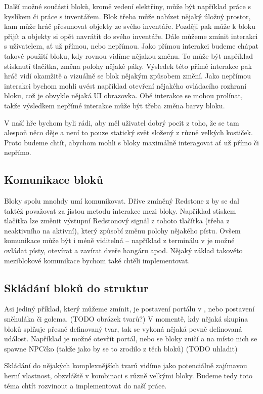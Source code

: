 Další možné součásti bloků, kromě vedení elektřiny, může být například práce s kyslíkem či práce s inventářem. Blok třeba může nabízet nějaký úložný prostor, kam může hráč přesunovat objekty ze svého inventáře. Později pak může k bloku přijít a objekty si opět navrátit do svého inventáře. 
Dále můžeme zmínit interakci s uživatelem, ať už přímou, nebo nepřímou. Jako přímou interakci budeme chápat takové použití bloku, kdy rovnou vidíme nějakou změnu. To může být například stisknutí tlačítka, změna polohy nějaké páky. Výsledek této přímé interakce pak hráč vidí okamžitě a vizuálně se blok nějakým způsobem změní. Jako nepřímou interakci bychom mohli uvést například otevření nějakého ovládacího rozhraní bloku, což je obvykle nějaká UI obrazovka. Obě interakce se mohou prolínat, takže výsledkem nepřímé interakce může být třeba změna barvy bloku.

V naší hře bychom byli rádi, aby měl uživatel dobrý pocit z toho, že se tam alespoň něco děje a není to pouze statický svět složený z různě velkých kostiček. Proto budeme chtít, abychom mohli s bloky maximálně interagovat ať už přímo či nepřímo.

\subsection{Komunikace bloků}
Bloky spolu mnohdy umí komunikovat. Dříve zmíněný Redstone z  by se dal taktéž považovat za jistou metodu interakce mezi bloky. Například stiskem tlačítka lze změnit výstupní Redstonový signál z tohoto tlačítka (třeba z neaktivního na aktivní), který způsobí změnu polohy nějakého pístu. Ovšem komunikace může být i méně viditelná -- například z terminálu v \SE{} je možné ovládat písty, otevírat a zavírat dveře hangáru apod. Nějaký základ takovéto meziblokové komunikace bychom také chtěli implementovat.


\subsection{Skládání bloků do struktur}
Asi jediný příklad, který můžeme zmínit, je postavení portálu v , nebo postavení sněhuláka či golema. (TODO obrázek tvarů?) V momentě, kdy nějaká skupina bloků splňuje přesně definovaný tvar, tak se vykoná nějaká pevně definovaná událost. Například je možné otevřít portál, nebo se bloky zničí a na místo nich se spawne NPCčko (takže jako by se to zrodilo z těch bloků) (TODO uhladit)

Skládání do nějakých komplexnějších tvarů vidíme jako potenciálně zajímavou herní vlastnost, obzvláště v kombinaci s různě velkými bloky. Budeme tedy toto téma chtít rozvinout a implementovat do naší práce. 

